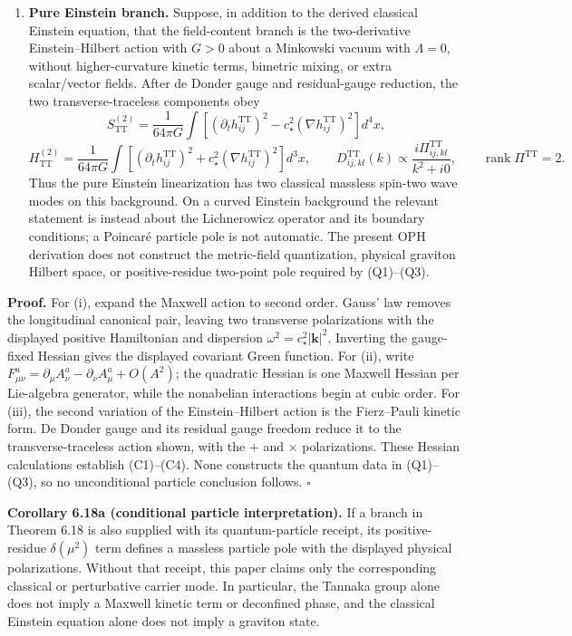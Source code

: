 \begin{enumerate}
\item \textbf{Pure Einstein branch.} Suppose, in addition to the derived classical Einstein
equation, that the field-content branch is the two-derivative Einstein--Hilbert action with \(G>0\) about a
Minkowski vacuum with \(\Lambda=0\), without higher-curvature kinetic terms, bimetric mixing, or
extra scalar/vector fields. After de Donder gauge and residual-gauge reduction, the two
transverse-traceless components obey
\[
S_{\mathrm{TT}}^{(2)}
=\frac{1}{64\pi G}\int
\left[
(\partial_t h_{ij}^{\mathrm{TT}})^2
-c_\star^2(\nabla h_{ij}^{\mathrm{TT}})^2
\right]d^4x,
\]
\[
H_{\mathrm{TT}}^{(2)}
=\frac{1}{64\pi G}\int
\left[
(\partial_t h_{ij}^{\mathrm{TT}})^2
+c_\star^2(\nabla h_{ij}^{\mathrm{TT}})^2
\right]d^3x,
\qquad
D^{\mathrm{TT}}_{ij,kl}(k)
\propto
\frac{i\Pi^{\mathrm{TT}}_{ij,kl}}{k^2+i0},
\qquad \operatorname{rank}\Pi^{\mathrm{TT}}=2.
\]
Thus the pure Einstein linearization has two classical massless spin-two wave modes on this
background. On a curved Einstein background the relevant statement is instead about the
Lichnerowicz operator and its boundary conditions; a Poincar\'e particle pole is not automatic.
The present OPH derivation does not construct the metric-field quantization, physical graviton
Hilbert space, or positive-residue two-point pole required by (Q1)--(Q3).
\end{enumerate}

\textbf{Proof.} For (i), expand the Maxwell action to second order. Gauss' law removes the
longitudinal canonical pair, leaving two transverse polarizations with the displayed positive
Hamiltonian and dispersion \(\omega^2=c_\star^2|\mathbf k|^2\). Inverting the gauge-fixed Hessian
gives the displayed covariant Green function. For (ii), write
\(F^a_{\mu\nu}=\partial_\mu A^a_\nu-\partial_\nu A^a_\mu+O(A^2)\); the quadratic Hessian is one
Maxwell Hessian per Lie-algebra generator, while the nonabelian interactions begin at cubic order.
For (iii), the second variation of the Einstein--Hilbert action is the Fierz--Pauli kinetic form.
De Donder gauge and its residual gauge freedom reduce it to the transverse-traceless action shown,
with the \(+\) and \(\times\) polarizations. These Hessian calculations establish (C1)--(C4).
None constructs the quantum data in (Q1)--(Q3), so no unconditional particle conclusion follows.
\(\square\)

\textbf{Corollary 6.18a (conditional particle interpretation).} If a branch in Theorem 6.18 is
also supplied with its quantum-particle receipt, its positive-residue \(\delta(\mu^2)\) term defines
a massless particle pole with the displayed physical polarizations. Without that receipt, this
paper claims only the corresponding classical or perturbative carrier mode. In particular, the
Tannaka group alone does not imply a Maxwell kinetic term or deconfined phase, and the classical
Einstein equation alone does not imply a graviton state.

